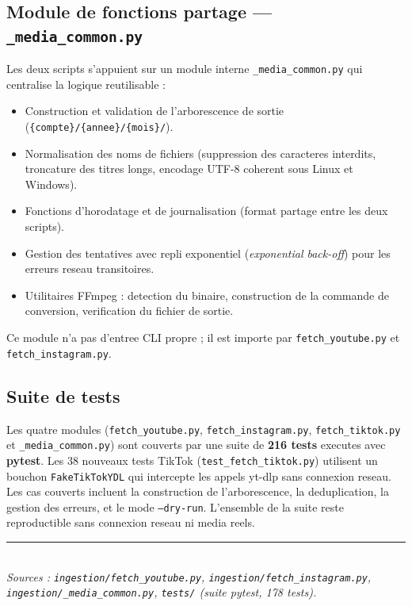 \documentclass[11pt, a4paper]{article}
\begin{document}
\subsection{Module de fonctions partage — \texttt{\_media\_common.py}}

Les deux scripts s'appuient sur un module interne \texttt{\_media\_common.py} qui
centralise la logique reutilisable :

\begin{itemize}
  \item Construction et validation de l'arborescence de sortie
    (\texttt{\{compte\}/\{annee\}/\{mois\}/}).
  \item Normalisation des noms de fichiers (suppression des caracteres interdits,
    troncature des titres longs, encodage UTF-8 coherent sous Linux et Windows).
  \item Fonctions d'horodatage et de journalisation (format partage entre les deux scripts).
  \item Gestion des tentatives avec repli exponentiel (\emph{exponential back-off}) pour
    les erreurs reseau transitoires.
  \item Utilitaires FFmpeg : detection du binaire, construction de la commande de
    conversion, verification du fichier de sortie.
\end{itemize}

Ce module n'a pas d'entree CLI propre ; il est importe par \texttt{fetch\_youtube.py}
et \texttt{fetch\_instagram.py}.

\subsection{Suite de tests}

Les quatre modules (\texttt{fetch\_youtube.py}, \texttt{fetch\_instagram.py},
\texttt{fetch\_tiktok.py} et \texttt{\_media\_common.py}) sont couverts par une suite de
\textbf{216 tests} executes avec \textbf{pytest}. Les 38 nouveaux tests TikTok
(\texttt{test\_fetch\_tiktok.py}) utilisent un bouchon \texttt{FakeTikTokYDL} qui
intercepte les appels yt-dlp sans connexion reseau. Les cas couverts incluent la
construction de l'arborescence, la deduplication, la gestion des erreurs, et le mode
\texttt{--dry-run}. L'ensemble de la suite reste reproductible sans connexion reseau
ni media reels.

\vspace{4pt}
\rule{\linewidth}{0.4pt}\\[2pt]
{\footnotesize\itshape Sources : \texttt{ingestion/fetch\_youtube.py},
\texttt{ingestion/fetch\_instagram.py}, \texttt{ingestion/\_media\_common.py},
\texttt{tests/} (suite pytest, 178 tests).}
\end{document}
